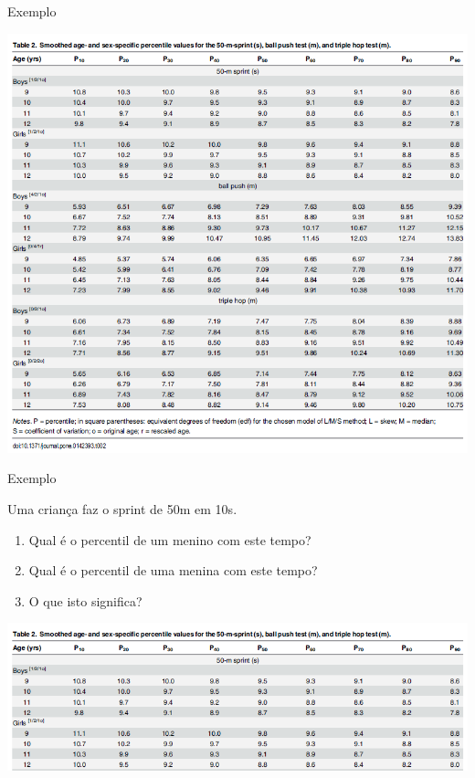 \documentclass{beamer}
\begin{document}
\begin{frame}{Exemplo}
  \begin{center}
    \includegraphics[height=\textheight]{Cap3/percentil1}
  \end{center}
\end{frame}

\begin{frame}{Exemplo}
  \begin{block}{}
    Uma criança faz o sprint de 50m em 10s.

    \begin{enumerate}
    \item Qual é o percentil de um menino com este tempo?
    \item Qual é o percentil de uma menina com este tempo?
    \item O que isto significa?
    \end{enumerate}
  \end{block}
  \begin{center}
    \includegraphics[width=1.2\textwidth]{Cap3/percentil2}
  \end{center}
\end{frame}
\end{document}
